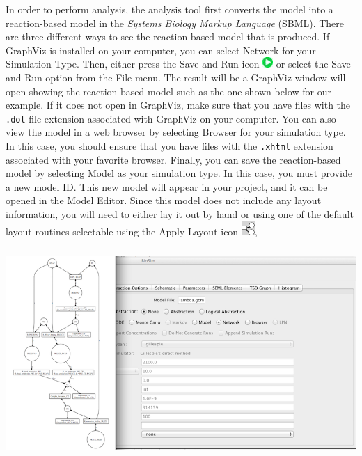 \documentclass[titlepage,11pt]{article}
\begin{document}
In order to perform analysis, the analysis tool first converts the model into a reaction-based model in the \emph{Systems Biology Markup Language} (SBML).  There are three different ways to see the reaction-based model that is produced.  If GraphViz is installed on your computer, you can select Network for your Simulation Type.  Then, either press the Save and Run icon \includegraphics{../gui/icons/run-icon} or select the Save and Run option from the File menu.  The result will be a GraphViz window will open showing the reaction-based model such as the one shown below for our example.  If it does not open in GraphViz, make sure that you have files with the {\tt .dot} file extension associated with GraphViz on your computer.  You can also view the model in a web browser by selecting Browser for your simulation type.  In this case, you should ensure that you have files with the {\tt .xhtml} extension associated with your favorite browser.  Finally, you can save the reaction-based model by selecting Model as your simulation type.  In this case, you must provide a new model ID.  This new model will appear in your project, and it can be opened in the Model Editor.  Since this model does not include any layout information, you will need to either lay it out by hand or using one of the default layout routines selectable using the Apply Layout icon \includegraphics{../gui/icons/modelview/choose_layout_selected},

\begin{center}
\includegraphics[height=80mm]{screenshots/viewNetwork}
\end{center}
\end{document}
